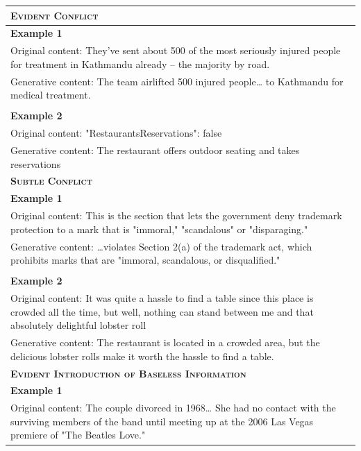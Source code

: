 \documentclass[11pt]{article}
\begin{document}
\begin{table}[!ht]

\renewcommand{\arraystretch}{1.1}

\small
\centering
    \begin{tabular}{p{}}
    \toprule
    \textbf{\textsc{Evident Conflict}}\\
    \midrule
    \textbf{Example 1}\\
    Original content: They’ve sent about 500 of the most seriously injured people for treatment in Kathmandu already -- the majority by road.\\
    Generative content: The team airlifted 500 injured people… to Kathmandu for medical treatment. \\
    \\
    \textbf{Example 2}\\
    Original content: "RestaurantsReservations": false\\
    Generative content: The restaurant offers outdoor seating and takes reservations\\
    \midrule
    \textbf{\textsc{Subtle Conflict}}\\
    \midrule
    \textbf{Example 1}\\
    Original content: This is the section that lets the government deny trademark protection to a mark that is "immoral," "scandalous" or "disparaging."\\
    Generative content: …violates Section 2(a) of the trademark act, which prohibits marks that are "immoral, scandalous, or disqualified."\\
    \\
    \textbf{Example 2}\\
    Original content: It was quite a hassle to find a table since this place is crowded all the time, but well, nothing can stand between me and that absolutely delightful lobster roll\\
    Generative content: The restaurant is located in a crowded area, but the delicious lobster rolls make it worth the hassle to find a table.\\
    \midrule
    \textbf{\textsc{Evident Introduction of Baseless Information}} \\
    \midrule
    \textbf{Example 1}\\
    Original content: The couple divorced in 1968… She had no contact with the surviving members of the band until meeting up at the 2006 Las Vegas premiere of "The Beatles Love." \\

\end{tabular}
\end{table}
\end{document}
